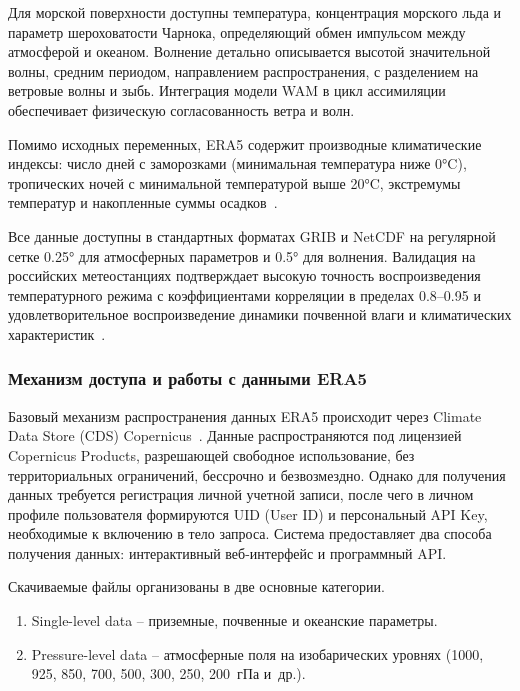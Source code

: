 Для морской поверхности доступны температура, концентрация морского льда и параметр шероховатости Чарнока, определяющий обмен импульсом между атмосферой и океаном. 
Волнение детально описывается высотой значительной волны, средним периодом, направлением распространения, с разделением на ветровые волны и зыбь. 
Интеграция модели WAM в цикл ассимиляции обеспечивает физическую согласованность ветра и волн.

Помимо исходных переменных, ERA5 содержит производные климатические индексы: число дней с заморозками (минимальная температура ниже 0°C), тропических ночей с минимальной температурой выше 20°C, экстремумы температур и накопленные суммы осадков~\cite{era5_single_levels_daily_earthdatahub}.

Все данные доступны в стандартных форматах GRIB и NetCDF на регулярной сетке 0.25° для атмосферных параметров и 0.5° для волнения. 
Валидация на российских метеостанциях подтверждает высокую точность воспроизведения температурного режима с коэффициентами корреляции в пределах 0.8–0.95 и удовлетворительное воспроизведение динамики почвенной влаги и климатических характеристик~\cite{Titkova2023ERA5Land}.


\subsubsection{Механизм доступа и работы с данными ERA5}
\label{sec:whether_data}

Базовый механизм распространения данных ERA5 происходит через Climate Data Store (CDS) Copernicus~\cite{c3s_era5_single_levels_hourly}. 
Данные распространяются под лицензией Copernicus Products, разрешающей свободное использование, без территориальных ограничений, бессрочно и безвозмездно.
Однако для получения данных требуется регистрация личной учетной записи, после чего в личном профиле пользователя формируются UID (User ID) и персональный API Key, необходимые к включению в тело запроса.
Система предоставляет два способа получения данных: интерактивный веб-интерфейс и программный API.

Скачиваемые файлы организованы в две основные категории.
\begin{enumerate}
    \item Single-level data -- приземные, почвенные и океанские параметры.
    \item Pressure-level data -- атмосферные поля на изобарических уровнях (1000, 925, 850, 700, 500, 300, 250, 200~гПа и~др.).
\end{enumerate}


